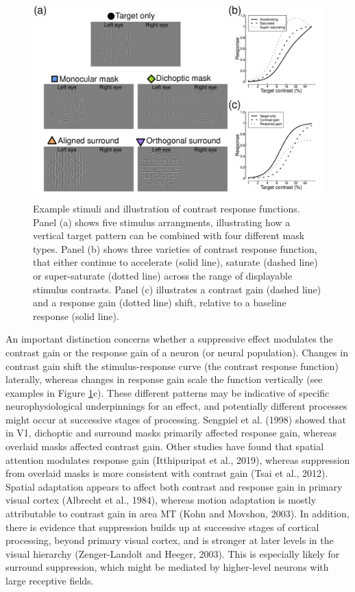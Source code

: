 \documentclass[]{article}
\begin{document}
\begin{figure}

{\centering \includegraphics{figures/stimfig} 

}

\caption{Example stimuli and illustration of contrast response functions. Panel (a) shows five stimulus arrangments, illustrating how a vertical target pattern can be combined with four different mask types. Panel (b) shows three varieties of contrast response function, that either continue to accelerate (solid line), saturate (dashed line) or super-saturate (dotted line) across the range of displayable stimulus contrasts. Panel (c) illustrates a contrast gain (dashed line) and a response gain (dotted line) shift, relative to a baseline response (solid line).}\label{fig:stimfig}
\end{figure}

An important distinction concerns whether a suppressive effect modulates the contrast gain or the response gain of a neuron (or neural population). Changes in contrast gain shift the stimulus-response curve (the contrast response function) laterally, whereas changes in response gain scale the function vertically (see examples in Figure \ref{fig:stimfig}c). These different patterns may be indicative of specific neurophysiological underpinnings for an effect, and potentially different processes might occur at successive stages of processing. Sengpiel et al. (1998) showed that in V1, dichoptic and surround masks primarily affected response gain, whereas overlaid masks affected contrast gain. Other studies have found that spatial attention modulates response gain (Itthipuripat et al., 2019), whereas suppression from overlaid masks is more consistent with contrast gain (Tsai et al., 2012). Spatial adaptation appears to affect both contrast and response gain in primary visual cortex (Albrecht et al., 1984), whereas motion adaptation is mostly attributable to contrast gain in area MT (Kohn and Movshon, 2003). In addition, there is evidence that suppression builds up at successive stages of cortical processing, beyond primary visual cortex, and is stronger at later levels in the visual hierarchy (Zenger-Landolt and Heeger, 2003). This is especially likely for surround suppression, which might be mediated by higher-level neurons with large receptive fields.
\end{document}
